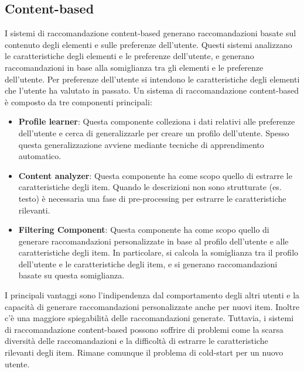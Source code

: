\subsection{Content-based}
I sistemi di raccomandazione content-based generano raccomandazioni basate sul contenuto degli elementi e sulle preferenze dell'utente. Questi sistemi analizzano le caratteristiche degli elementi e le preferenze dell'utente, e generano raccomandazioni in base alla somiglianza tra gli elementi e le preferenze dell'utente. Per preferenze dell'utente si intendono le caratteristiche degli elementi che l'utente ha valutato in passato.
Un sistema di raccomandazione content-based è composto da tre componenti principali:
\begin{itemize}
    \item \textbf{Profile learner}: Questa componente colleziona i dati relativi alle preferenze dell'utente e cerca di generalizzarle per creare un profilo dell'utente. Spesso questa generalizzazione avviene mediante tecniche di apprendimento automatico.
    \item \textbf{Content analyzer}: Questa componente ha come scopo quello di estrarre le caratteristiche degli item. Quando le descrizioni non sono strutturate (es. testo) è necessaria una fase di pre-processing per estrarre le caratteristiche rilevanti.
    \item \textbf{Filtering Component}: Questa componente ha come scopo quello di generare raccomandazioni personalizzate in base al profilo dell'utente e alle caratteristiche degli item. In particolare, si calcola la somiglianza tra il profilo dell'utente e le caratteristiche degli item, e si generano raccomandazioni basate su questa somiglianza.
\end{itemize}
I principali vantaggi sono l'indipendenza dal comportamento degli altri utenti e la capacità di generare raccomandazioni personalizzate anche per nuovi item. Inoltre c'è una maggiore spiegabilità delle raccomandazioni generate. Tuttavia, i sistemi di raccomandazione content-based possono soffrire di problemi come la scarsa diversità delle raccomandazioni e la difficoltà di estrarre le caratteristiche rilevanti degli item. Rimane comunque il problema di cold-start per un nuovo utente.
